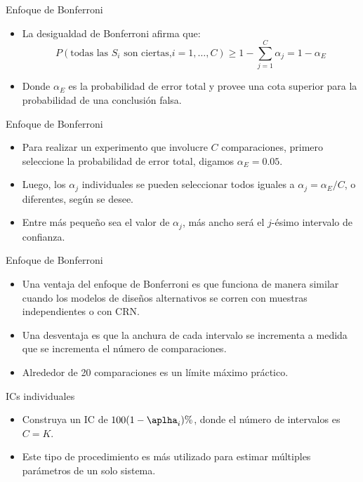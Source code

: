 \begin{frame}{Enfoque de Bonferroni}
    \begin{itemize}
        \item La desigualdad de Bonferroni afirma que:\\
        $$\textit{P}(\text{todas las }S_i \text{ son ciertas,} i=1,\dots, C)\geq 1 - \sum_{j=1}^{C}{\alpha_j}=1-\alpha_E$$
        \item Donde $\alpha_E$ es la probabilidad de error total y provee una cota superior para la probabilidad de una conclusión falsa.
    \end{itemize}
\end{frame}

\begin{frame}{Enfoque de Bonferroni}
    \begin{itemize}
        \item Para realizar un experimento que involucre $C$ comparaciones, primero seleccione la probabilidad de error total, digamos $\alpha_E=0.05$. 
        \item Luego, los $\alpha_j$ individuales se pueden seleccionar todos iguales a $\alpha_j=\alpha_E/C$, o diferentes, según se desee.
        \item Entre más pequeño sea el valor de $\alpha_j$, más ancho será el $j$-ésimo intervalo de confianza.
    \end{itemize}
\end{frame}

\begin{frame}{Enfoque de Bonferroni}
    \begin{itemize}
        \item Una ventaja del enfoque de Bonferroni es que funciona de manera similar cuando los modelos de diseños alternativos se corren con muestras independientes o con CRN.
        \item Una desventaja es que la anchura de cada intervalo se incrementa a medida que se incrementa el número de comparaciones.
        \item Alrededor de 20 comparaciones es un límite máximo práctico.
    \end{itemize}
\end{frame}

\begin{frame}{ICs individuales}
	\begin{itemize}
		\item Construya un IC de $100(1-\aplha_i)\%$, donde el número de intervalos es $C=K$.
		\item Este tipo de procedimiento es más utilizado para estimar múltiples parámetros de un solo sistema.
	\end{itemize}
\end{frame}

